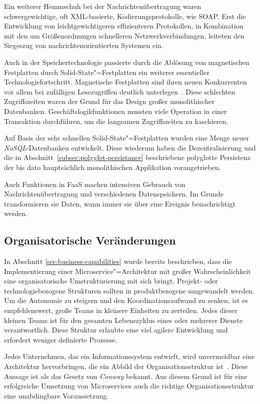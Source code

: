 Ein weiterer Hemmschuh bei der Nachrichtenübertragung waren schwergewichtige, oft XML-basierte, Kodierungsprotokolle, wie \zB SOAP. Erst die Entwicklung von leichtgewichtigeren \bzw effizienteren Protokollen, in Kombination mit den um Größenordnungen schnelleren Netzwerkverbindungen, leiteten den Siegeszug von nachrichtenorientierten Systemen ein.

Auch in der Speichertechnologie passierte durch die Ablösung von magnetischen Festplatten durch Solid-State"=Festplatten ein weiterer essentieller Technologiefortschritt. Magnetische Festplatten sind ihren neuen Konkurrenten vor allem bei zufälligen Lesezugriffen deutlich unterlegen~\cite{Regola:2012:CMV:2379436.2379437}. Diese schlechten Zugriffszeiten waren der Grund für das Design großer monolithischer Datenbanken. Geschäftslogikfunktionen mussten viele Operation in einer Transaktion durchführen, um die langsamen Zugriffszeiten zu kaschieren.

Auf Basis der sehr schnellen Solid-State"=Festplatten wurden eine Menge neuer \textit{NoSQL}-Datenbanken entwickelt. Diese wiederum haben die Dezentralisierung und die in Abschnitt~\ref{subsec:polyglot-persistance} beschriebene polyglotte Persistenz der bis dato hauptsächlich monolithischen Applikation vorangetrieben.

Auch Funktionen in FaaS machen intensiven Gebrauch von Nachrichtenübertragung und verschiedenen Datenspeichern. Im Grunde transformieren sie Daten, wann immer sie über eine Ereignis benachrichtigt werden.

\subsection{Organisatorische Veränderungen}

In Abschnitt \ref{sec:business-capabilities} wurde bereits beschrieben, dass die Implementierung einer Microservice"=Architektur mit großer Wahrscheinlichkeit eine organisatorische Umstrukturierung mit sich bringt. Projekt- oder technologiebezogene Strukturen sollten in produktbezogene umgewandelt werden. Um die Autonomie zu steigern und den Koordinationsaufwand zu senken, ist es empfehlenswert, große Teams in kleinere Einheiten zu zerteilen. Jedes dieser kleinen Teams ist für den gesamten Lebenszyklus eines oder mehrerer Dienste verantwortlich. Diese Struktur erlaubte eine viel agilere Entwicklung und erfordert weniger definierte Prozesse.

Jedes Unternehmen, das ein Informationssystem entwirft, wird unvermeidbar eine Architektur hervorbringen, die ein Abbild der Organisationsstruktur ist~\cite{paper:conway:1968}. Diese Aussage ist als das Gesetz von \textit{Conway} bekannt. Aus diesem Grund ist für eine erfolgreiche Umsetzung von Microservices auch die richtige Organisationsstruktur eine unabdingbare Voraussetzung.

